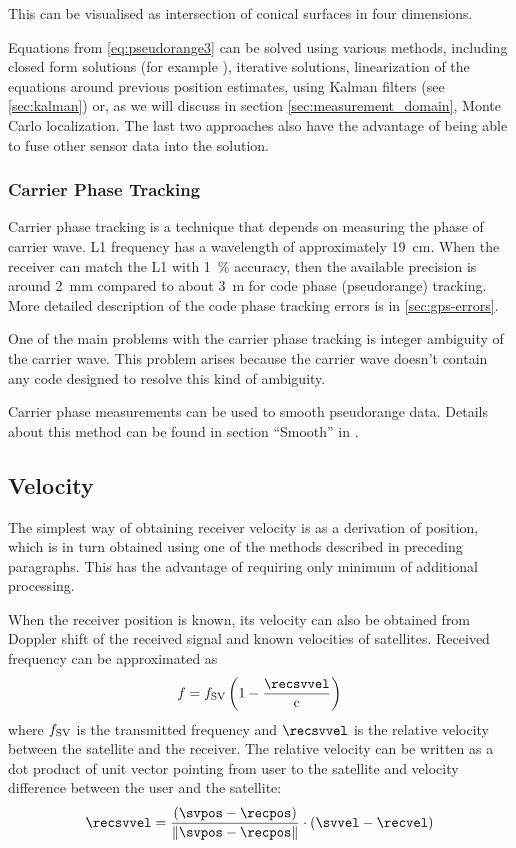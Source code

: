 This can be visualised as intersection of conical surfaces in four dimensions.

Equations from \eqref{eq:pseudorange3} can be solved using various methods, including closed form solutions
(for example \cite{leva96}), iterative solutions, linearization of the equations around
previous position estimates, using Kalman filters (see \ref{sec:kalman}) or,
as we will discuss in section \ref{sec:measurement_domain}, Monte Carlo localization.
The last two approaches also have the advantage of being able to fuse other sensor data
into the solution.

\subsubsection{Carrier Phase Tracking}
\label{sec:gps_carrier_phase}

Carrier phase tracking is a technique that depends on measuring the phase of carrier wave.
L1 frequency has a wavelength of approximately \SI{19}{\centi\meter}.
When the receiver can match the L1 with \SI{1}{\percent} accuracy, then the available precision
is around \SI{2}{\milli\meter} compared to about \SI{3}{\meter} for code phase (pseudorange)
tracking. More detailed description of the code phase tracking errors is in \cref{sec:gps-errors}.

One of the main problems with the carrier phase tracking is integer ambiguity of the carrier wave.
This problem arises because the carrier wave doesn't contain any code designed to resolve
this kind of ambiguity.

Carrier phase measurements can be used to smooth pseudorange data.
Details about this method can be found in section \enquote{Smooth} in \cite{sam-www}.

\subsection{Velocity}
The simplest way of obtaining receiver velocity is as a derivation of
position, which is in turn obtained using one of the methods described in preceding paragraphs.
This has the advantage of requiring only minimum of additional processing.

When the receiver position is known, its velocity can also be obtained from Doppler shift of
the received signal and known velocities of satellites.
Received frequency can be approximated as
\begin{equation}
	f = f_\SV \left(1 - \frac{\recsvvel}{\speedoflight}\right)
	\label{eq:doppler}
\end{equation}
where \(f_{\mathrm{SV}}\) is the transmitted frequency and \(\recsvvel\) is the relative velocity
between the satellite and the receiver.
The relative velocity can be written as a dot product of unit vector pointing
from user to the satellite and velocity difference between the user and the satellite:
\begin{equation}
	\recsvvel = \frac{
		(\svpos - \recpos)
	}{
		\norm{\svpos - \recpos}
	} \cdot (\svvel - \recvel)
	\label{eq:doppler-velocity}
\end{equation}

